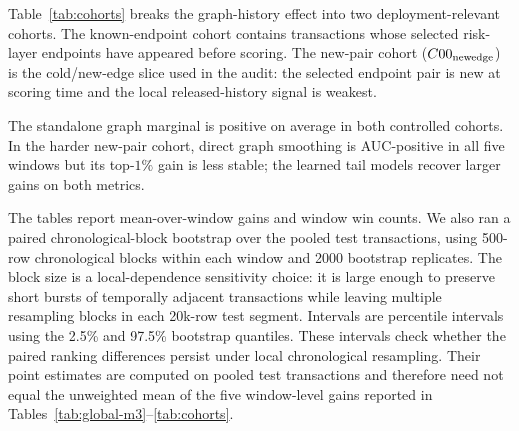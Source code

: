 \documentclass[11pt]{article}
\theoremstyle{definition}
\theoremstyle{remark}
\begin{document}
Table~\ref{tab:cohorts} breaks the graph-history effect into two deployment-relevant cohorts. The known-endpoint cohort contains transactions whose selected risk-layer endpoints have appeared before scoring. The new-pair cohort ($C00_{\rm newedge}$) is the cold/new-edge slice used in the audit: the selected endpoint pair is new at scoring time and the local released-history signal is weakest.

\begin{table}[h]
\centering
\caption{Critical-cohort gains over raw released history.}
\label{tab:cohorts}
\end{table}
\FloatBarrier

The standalone graph marginal is positive on average in both controlled cohorts. In the harder new-pair cohort, direct graph smoothing is AUC-positive in all five windows but its top-$1\%$ gain is less stable; the learned tail models recover larger gains on both metrics.

The tables report mean-over-window gains and window win counts. We also ran a paired chronological-block bootstrap over the pooled test transactions, using 500-row chronological blocks within each window and 2000 bootstrap replicates. The block size is a local-dependence sensitivity choice: it is large enough to preserve short bursts of temporally adjacent transactions while leaving multiple resampling blocks in each 20k-row test segment. Intervals are percentile intervals using the 2.5\% and 97.5\% bootstrap quantiles. These intervals check whether the paired ranking differences persist under local chronological resampling. Their point estimates are computed on pooled test transactions and therefore need not equal the unweighted mean of the five window-level gains reported in Tables~\ref{tab:global-m3}--\ref{tab:cohorts}.
\end{document}
